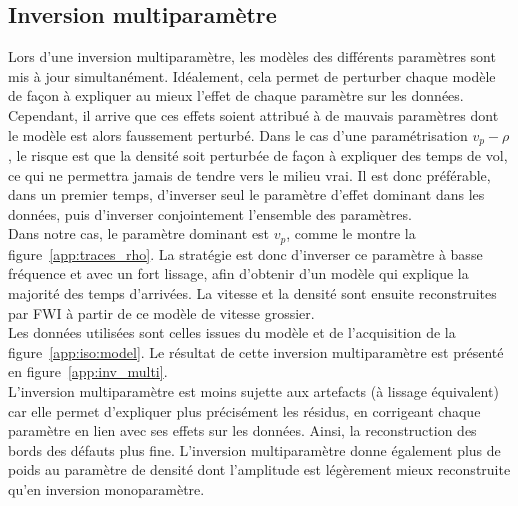 \subsection{Inversion multiparamètre}

Lors d'une inversion multiparamètre, les modèles des différents paramètres sont mis à jour simultanément. Idéalement, cela permet de perturber chaque modèle de façon à expliquer au mieux l'effet de chaque paramètre sur les données. Cependant, il arrive que ces effets soient attribué à de mauvais paramètres dont le modèle est alors faussement perturbé. Dans le cas d'une paramétrisation $v_{p}-\rho$, le risque est que la densité soit perturbée de façon à expliquer des temps de vol, ce qui ne permettra jamais de tendre vers le milieu vrai. Il est donc préférable, dans un premier temps, d'inverser seul le paramètre d'effet dominant dans les données, puis d'inverser conjointement l'ensemble des paramètres.\\

 Dans notre cas, le paramètre dominant est $v_{p}$, comme le montre la figure~\ref{app:traces_rho}. La stratégie est donc d'inverser ce paramètre à basse fréquence et avec un fort lissage, afin d'obtenir d'un modèle qui explique la majorité des temps d'arrivées. La vitesse et la densité sont ensuite reconstruites par FWI à partir de ce modèle de vitesse grossier. \\
 
Les données utilisées sont celles issues du modèle et de l'acquisition de la figure~\ref{app:iso:model}.  Le résultat de cette inversion multiparamètre est présenté en figure~\ref{app:inv_multi}. 
\\

L'inversion multiparamètre est moins sujette aux artefacts (à lissage équivalent) car elle permet d'expliquer plus précisément les résidus, en corrigeant chaque paramètre  en lien avec ses effets sur les données. Ainsi, la reconstruction des bords des défauts plus fine.  L'inversion multiparamètre donne également plus de poids au paramètre de densité dont l'amplitude est légèrement mieux reconstruite qu'en inversion monoparamètre.  




